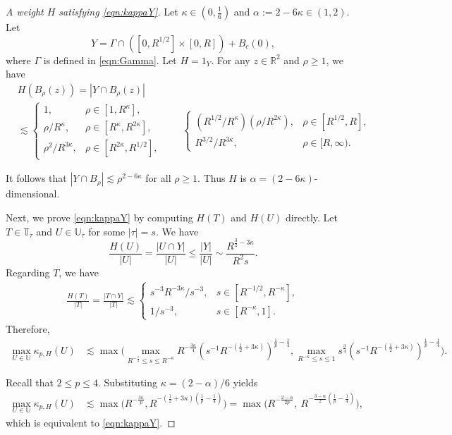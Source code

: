 \documentclass[11pt]{amsart}
\theoremstyle{definition}
\theoremstyle{remark}
\newcommand{\R}{\mathbb{R}}
\newcommand{\T}{\mathbb{T}}
\newcommand{\U}{\mathbb{U}}
\newcommand{\les}{\lesssim}
\begin{document}
\begin{proof}[\textit{A weight $H$ satisfying \protect\eqref{eqn:kappaY}}]
Let $\kappa\in(0,\frac16)$ and $\alpha:=2-6\kappa\in(1,2)$. 
	Let  \[Y = \Gamma\cap ([0,R^{1/2}]\times [0,R]) + B_c(0),\]
    where $\Gamma$ is defined in \eqref{eqn:Gamma}. Let $H=1_Y$. For any $z\in \R^2$ and $\rho \ge1$, we have
\begin{align*}
&H(B_\rho(z)) = |Y\cap B_\rho(z)| \\
&\lesssim
\begin{cases}
1, & \rho \in [1, R^\kappa],\\[1ex]
\rho/R^\kappa, & \rho \in [R^\kappa, R^{2\kappa}],\\[1ex]
\rho^2/R^{3\kappa}, & \rho \in [R^{2\kappa}, R^{1/2}],
\end{cases}
\qquad
\begin{cases}
(R^{1/2}/R^\kappa)(\rho/R^{2\kappa}), & \rho \in [R^{1/2}, R],\\[1ex]
R^{3/2}/R^{3\kappa}, & \rho \in [R, \infty).
\end{cases}
\end{align*}



It follows that $|Y\cap B_\rho| \les \rho^{2-6\kappa}$ for all $\rho\ge1$.
Thus $H$ is $\alpha=(2-6\kappa)$-dimensional.

	
Next, we prove \eqref{eqn:kappaY} by computing  $H(T)$ and $H(U)$ directly.
Let $T\in \T_\tau$ and $U\in \U_\tau$ for some $|\tau|=s$. 
We have
\[
\frac{H(U)}{|U|} = \frac{|U\cap Y|}{|U|} \le \frac{|Y|}{|U|} \sim \frac{R^{\frac 32-3\kappa}}{R^2s}.
\]
Regarding $T$, we have 
\begin{align*}
\frac{H(T)}{|T|} = \frac{|T\cap Y|}{|T|} \lesssim
\begin{cases}
	s^{-3}R^{-3\kappa}/s^{-3}, & s\in [R^{-1/2},R^{-\kappa}], \\
	1/s^{-3}, & s \in [R^{-\kappa},1].
\end{cases}
\end{align*}
Therefore,
\begin{align*}
	\max_{U\in \U} \kappa_{p,H}(U) &\les \max\Big( 
	\max_{R^{-\frac12}\le s\le R^{-\kappa}} R^{-\frac {3\kappa} 4} (s^{-1} R^{-(\frac 1 2 + 3\kappa )})^{\frac{1}{p}-\frac{1}{4} },
	\max_{R^{-\kappa}\le s\le 1} s^{\frac 3 4} (s^{-1} R^{-(\frac 1 2 + 3\kappa )})^{\frac{1}{p}-\frac{1}{4} } \Big).
	\end{align*}

Recall that $2\leq p\leq 4$. Substituting $\kappa=(2-\alpha)/6$ yields
\begin{align*}
	\max_{U\in \U} \kappa_{p,H}(U)
		&\lesssim \max\Big(  R^{-\frac {3\kappa} p}, R^{-(\frac 1 2 + 3\kappa )(\frac{1}{p}-\frac{1}{4}) } \Big)
=\max\Big(R^{-\frac{2-\alpha}{2p}},~ R^{-\frac{3-\alpha}2(\frac1p-\frac14)}\Big),
\end{align*}
which is equivalent to \eqref{eqn:kappaY}.
\end{proof}
\end{document}
